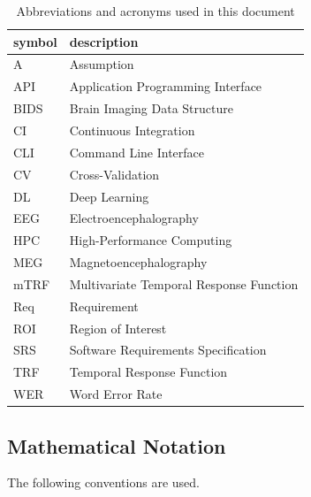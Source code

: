 \documentclass[12pt]{article}
\begin{document}
\renewcommand{\arraystretch}{1.2}
\begin{table}[ht]
\noindent \begin{tabular}{l p{12cm}}
\toprule
\textbf{symbol} & \textbf{description}\\
\midrule
A & Assumption\\
API & Application Programming Interface\\
BIDS & Brain Imaging Data Structure\\
CI & Continuous Integration\\
CLI & Command Line Interface\\
CV & Cross-Validation\\
DL & Deep Learning\\
EEG & Electroencephalography\\
HPC & High-Performance Computing\\
MEG & Magnetoencephalography\\
mTRF & Multivariate Temporal Response Function\\
Req & Requirement\\
ROI & Region of Interest\\
SRS & Software Requirements Specification\\
TRF & Temporal Response Function\\
WER & Word Error Rate\\
\bottomrule
\end{tabular}
\caption{Abbreviations and acronyms used in this document}
\end{table}







\subsection{Mathematical Notation}
The following conventions are used.
\end{document}
